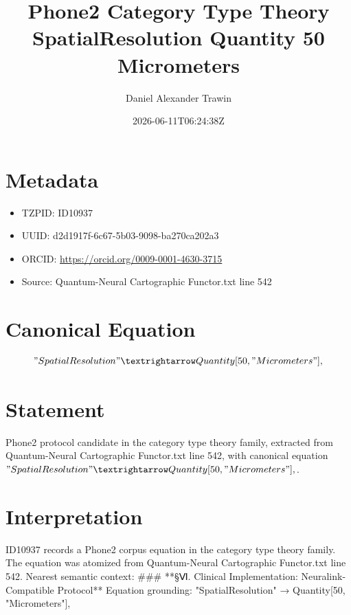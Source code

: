 \documentclass[11pt]{article}
\title{Phone2 Category Type Theory SpatialResolution Quantity 50 Micrometers}
\author{Daniel Alexander Trawin}
\date{2026-06-11T06:24:38Z}
\begin{document}
\maketitle
\section*{Metadata}
\begin{itemize}
\item TZPID: ID10937
\item UUID: d2d1917f-6c67-5b03-9098-ba270ca202a3
\item ORCID: \url{https://orcid.org/0009-0001-4630-3715}
\item Source: Quantum-Neural Cartographic Functor.txt line 542
\end{itemize}
\section*{Canonical Equation}
\[
"SpatialResolution" → Quantity[50, "Micrometers"],
\]
\section*{Statement}
Phone2 protocol candidate in the category type theory family, extracted from Quantum-Neural Cartographic Functor.txt line 542, with canonical equation $"SpatialResolution" → Quantity[50, "Micrometers"],$.
\section*{Interpretation}
ID10937 records a Phone2 corpus equation in the category type theory family. The equation was atomized from Quantum-Neural Cartographic Functor.txt line 542. Nearest semantic context: ### **§Ⅵ. Clinical Implementation: Neuralink-Compatible Protocol** Equation grounding: "SpatialResolution" → Quantity[50, "Micrometers"],
\end{document}
